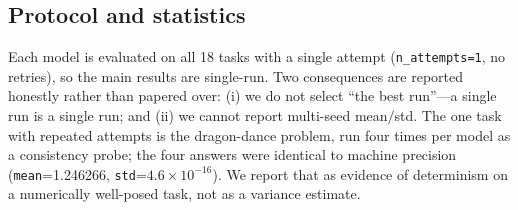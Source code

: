 \subsection{Protocol and statistics}
Each model is evaluated on all 18 tasks with a single attempt (\texttt{n\_attempts=1}, no retries), so the main results are single-run. Two consequences are reported honestly rather than papered over: (i) we do not select ``the best run''---a single run is a single run; and (ii) we cannot report multi-seed mean$/$std. The one task with repeated attempts is the dragon-dance problem, run four times per model as a consistency probe; the four answers were identical to machine precision (\texttt{mean}=1.246266, \texttt{std}=$4.6\times10^{-16}$). We report that as evidence of determinism on a numerically well-posed task, not as a variance estimate.
